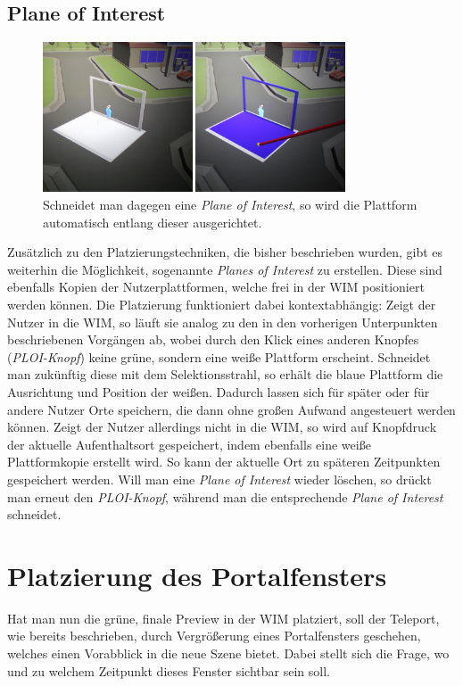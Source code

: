 \subsection{Plane of Interest}

\begin{figure}[h!]
  \centering
  \includegraphics[width=0.8\textwidth]{images/platform_bluewhite.JPG}
  \caption{Schneidet man dagegen eine \textit{Plane of Interest}, so wird die Plattform automatisch entlang dieser ausgerichtet.}
  \label{fig:todo}
\end{figure}

Zusätzlich zu den Platzierungstechniken, die bisher beschrieben wurden, gibt es weiterhin die Möglichkeit, sogenannte \textit{Planes of Interest} zu erstellen. Diese sind ebenfalls Kopien der Nutzerplattformen, welche frei in der WIM positioniert werden können. Die Platzierung funktioniert dabei kontextabhängig:
Zeigt der Nutzer in die WIM, so läuft sie analog zu den in den vorherigen Unterpunkten beschriebenen Vorgängen ab, wobei durch den Klick eines anderen Knopfes (\textit{PLOI-Knopf}) keine grüne, sondern eine weiße Plattform erscheint. Schneidet man zukünftig diese mit dem Selektionsstrahl, so erhält die blaue Plattform die Ausrichtung und Position der weißen. Dadurch lassen sich für später oder für andere Nutzer Orte speichern, die dann ohne großen Aufwand angesteuert werden können.
Zeigt der Nutzer allerdings nicht in die WIM, so wird auf Knopfdruck der aktuelle Aufenthaltsort gespeichert, indem ebenfalls eine weiße Plattformkopie erstellt wird. So kann der aktuelle Ort zu späteren Zeitpunkten gespeichert werden.
Will man eine \textit{Plane of Interest} wieder löschen, so drückt man erneut den \textit{PLOI-Knopf}, während man die entsprechende \textit{Plane of Interest} schneidet.


\section{Platzierung des Portalfensters}
Hat man nun die grüne, finale Preview in der WIM platziert, soll der Teleport, wie bereits beschrieben, durch Vergrößerung eines Portalfensters geschehen, welches einen Vorabblick in die neue Szene bietet. Dabei stellt sich die Frage, wo und zu welchem Zeitpunkt dieses Fenster sichtbar sein soll.

